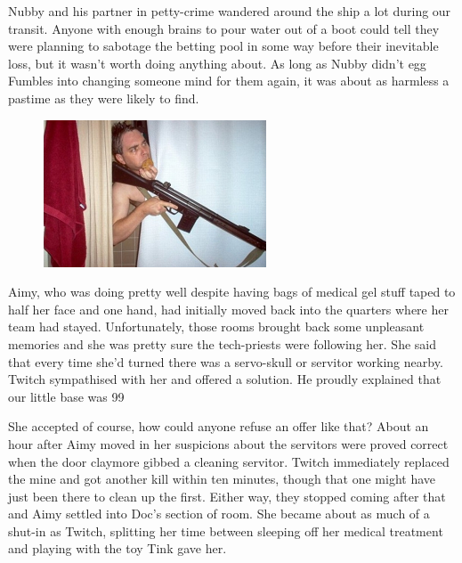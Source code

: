 Nubby and his partner in petty-crime wandered around the ship a lot during our transit. 
Anyone with enough brains to pour water out of a boot could tell they were planning to sabotage the betting pool in some way before their inevitable loss, but it wasn't worth doing anything about. 
As long as Nubby didn't egg Fumbles into changing someone mind for them again, it was about as harmless a pastime as they were likely to find.
\begin{figure}
	\begin{center}
		\includegraphics[width=\figwidth]{pics/11/40.png}
	\end{center}
\end{figure}
Aimy, who was doing pretty well despite having bags of medical gel stuff taped to half her face and one hand, had initially moved back into the quarters where her team had stayed. 
Unfortunately, those rooms brought back some unpleasant memories and she was pretty sure the tech-priests were following her. 
She said that every time she'd turned there was a servo-skull or servitor working nearby. 
Twitch sympathised with her and offered a solution. 
He proudly explained that our little base was 99%


She accepted of course, how could anyone refuse an offer like that? 
About an hour after Aimy moved in her suspicions about the servitors were proved correct when the door claymore gibbed a cleaning servitor. 
Twitch immediately replaced the mine and got another kill within ten minutes, though that one might have just been there to clean up the first. 
Either way, they stopped coming after that and Aimy settled into Doc's section of room. 
She became about as much of a shut-in as Twitch, splitting her time between sleeping off her medical treatment and playing with the toy Tink gave her.

